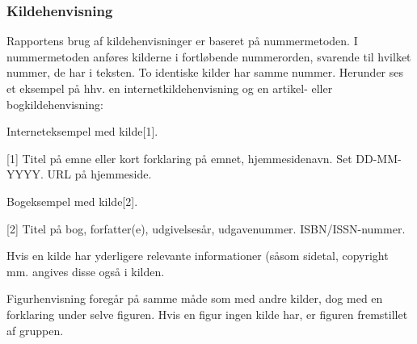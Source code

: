 \subsubsection{Kildehenvisning}
Rapportens brug af kildehenvisninger er baseret på nummermetoden. I nummermetoden anføres kilderne i fortløbende nummerorden, svarende til hvilket nummer, de har i teksten. To identiske kilder har samme nummer. Herunder ses et eksempel på hhv. en internetkildehenvisning og en artikel- eller bogkildehenvisning:

Interneteksempel med kilde[1].

[1] Titel på emne eller kort forklaring på emnet, hjemmesidenavn. Set DD-MM-YYYY. URL på hjemmeside.


Bogeksempel med kilde[2].

[2] Titel på bog, forfatter(e), udgivelsesår, udgavenummer. ISBN/ISSN-nummer.


Hvis en kilde har yderligere relevante informationer (såsom sidetal, copyright mm. angives disse også i kilden.


Figurhenvisning foregår på samme måde som med andre kilder, dog med en forklaring under selve figuren. Hvis en figur ingen kilde har, er figuren fremstillet af gruppen.
